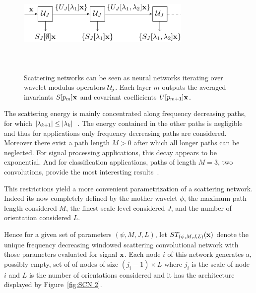 \documentclass{article}
\begin{document}
    \begin{figure}
      \begin{center}
        \includegraphics[width=3.3in, height=2in, keepaspectratio]{scatnet_crop.pdf}
        \caption[Scattering convolution network.]{\centering  Scattering networks can be seen as neural networks iterating over wavelet  modulus  operators $\mathcal{U}_{j}$. Each layer $m$ outputs the averaged  invariants $S[p_{m}]{\bf x}$ and covariant coefficients $U[p_{m+1}]{\bf x}$.}
        \label{fig:SCN 1}
      \end{center}
      \vspace{-15pt}
    \end{figure}
    
    The scattering energy is mainly concentrated along frequency decreasing paths, \ie for which $\left| \lambda_{k+1} \right| \leq \left| \lambda_{k} \right|$~\cite{mallat2012gis}. The energy contained in the other paths is negligible and thus for applications only frequency decreasing paths are considered. Moreover there exist a path length $M > 0$ after which all longer paths can be neglected. For signal processing applications, this decay appears to be exponential. And for classification applications, paths of length $M = 3$, \ie two convolutions, provide the most interesting results~\cite{anden2011multiscale, bruna2010classification}.
      
    This restrictions yield a more convenient parametrization of a scattering network. Indeed its now completely defined by the mother wavelet $\phi$, the maximum path length considered $M$, the finest scale level considered $J$, and the number of orientation considered $L$.
      
    Hence for a given set of parameters $(\psi, M,J,L)$, let $ST_{(\psi,M,J,L)}({\bf x})$ denote the unique frequency decreasing windowed scattering convolutional network with those parameters evaluated for signal ${\bf x}$. Each node $i$ of this network generates a, possibly empty, set of of nodes of size $(j_{i}-1) \times L$ where $j_{i}$ is the scale of node $i$ and $L$ is the number of orientations considered and it has the architecture displayed by Figure~\ref{fig:SCN 2}.
\end{document}
